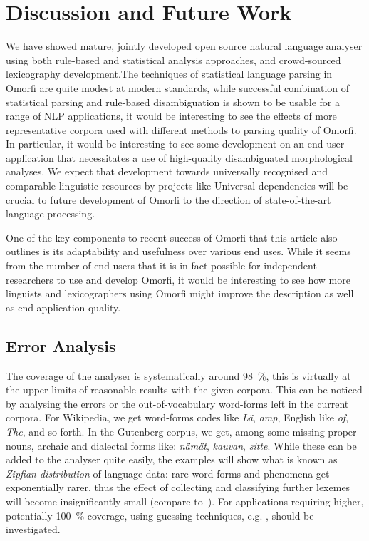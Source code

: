 \documentclass[a4paper,12pt]{article}
\begin{document}
\section{Discussion and Future Work}
\label{sec:discussion}

We have showed mature, jointly developed open source natural language analyser
using both rule-based and statistical analysis approaches, and crowd-sourced
lexicography development.The techniques of statistical language parsing in
Omorfi are quite modest at modern standards, while successful combination of
statistical parsing and rule-based disambiguation is shown to be usable for a
range of NLP applications, it would be interesting to see the effects of more
representative corpora used with different methods to parsing quality of
Omorfi.  In particular, it would be interesting to see some development on an
end-user application that necessitates a use of high-quality disambiguated
morphological analyses.  We expect that development towards universally
recognised and comparable linguistic resources by projects like Universal
dependencies will be crucial to future development of Omorfi to the direction
of state-of-the-art language processing.

One of the key components to recent success of Omorfi that this article also
outlines is its adaptability and usefulness over various end uses.  While it
seems from the number of end users that it is in fact possible for independent
researchers to use and develop Omorfi, it would be interesting to see how more
linguists and lexicographers using Omorfi might improve the description as well
as end application quality.

\subsection{Error Analysis}

The coverage of the analyser is systematically around 98~\%, this is virtually
at the upper limits of reasonable results with the given corpora.  This can be
noticed by analysing the errors or the out-of-vocabulary word-forms left in the
current corpora. For Wikipedia, we get word-forms codes like \textit{Lä},
\textit{amp}, English like \textit{of}, \textit{The}, and so forth. In the
Gutenberg corpus, we get, among some missing proper nouns, archaic and
dialectal forms like: \textit{nämät}, \textit{kauvan}, \textit{sitte}.  While
these can be added to the analyser quite easily, the  examples will show what
is known as \textit{Zipfian distribution} of language data: rare word-forms and
phenomena get exponentially rarer, thus the effect of collecting and
classifying further lexemes will become insignificantly small (compare
to~\citet{manning2011part}). For applications requiring higher, potentially
100~\% coverage, using guessing techniques, e.g. \citet{mikheev1997automatic},
should be investigated.
\end{document}
